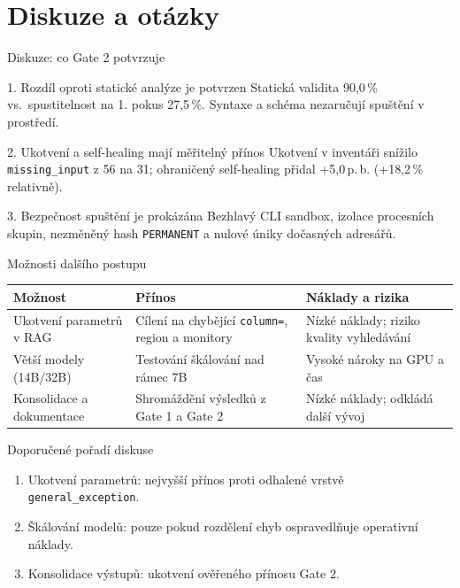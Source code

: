 \documentclass[aspectratio=169,10pt]{beamer}
\begin{document}
\section{Diskuze a otázky}

\begin{frame}[t]{Diskuze: co Gate 2 potvrzuje}
  \small
  \begin{block}{1. Rozdíl oproti statické analýze je potvrzen}
    Statická validita 90,0\,\% vs.\ spustitelnost na 1. pokus 27,5\,\%.
    Syntaxe a schéma nezaručují spuštění v prostředí.
  \end{block}

  \vspace{2mm}

  \begin{block}{2. Ukotvení a self-healing mají měřitelný přínos}
    Ukotvení v inventáři snížilo \texttt{missing\_input} z 56 na 31; ohraničený
    self-healing přidal +5,0\,p.\,b. (+18,2\,\% relativně).
  \end{block}

  \vspace{2mm}

  \begin{block}{3. Bezpečnost spuštění je prokázána}
    Bezhlavý CLI sandbox, izolace procesních skupin, nezměněný hash
    \texttt{PERMANENT} a nulové úniky dočasných adresářů.
  \end{block}
\end{frame}

\begin{frame}[t]{Možnosti dalšího postupu}
  \small
  \begin{table}
    \centering
    \begin{tabular}{@{}p{3.8cm}p{4.2cm}p{5.0cm}@{}}
      \toprule
      \textbf{Možnost} & \textbf{Přínos} & \textbf{Náklady a rizika} \\
      \midrule
      Ukotvení parametrů v RAG
        & Cílení na chybějící \texttt{column=}, region a monitory
        & Nízké náklady; riziko kvality vyhledávání \\
      Větší modely (14B/32B)
        & Testování škálování nad rámec 7B
        & Vysoké nároky na GPU a čas \\
      Konsolidace a dokumentace
        & Shromáždění výsledků z Gate 1 a Gate 2
        & Nízké náklady; odkládá další vývoj \\
      \bottomrule
    \end{tabular}
  \end{table}

  \begin{block}{Doporučené pořadí diskuse}
    \begin{enumerate}
      \item Ukotvení parametrů: nejvyšší přínos proti odhalené vrstvě
            \texttt{general\_exception}.
      \item Škálování modelů: pouze pokud rozdělení chyb ospravedlňuje
            operativní náklady.
      \item Konsolidace výstupů: ukotvení ověřeného přínosu Gate 2.
    \end{enumerate}
  \end{block}
\end{frame}
\end{document}
